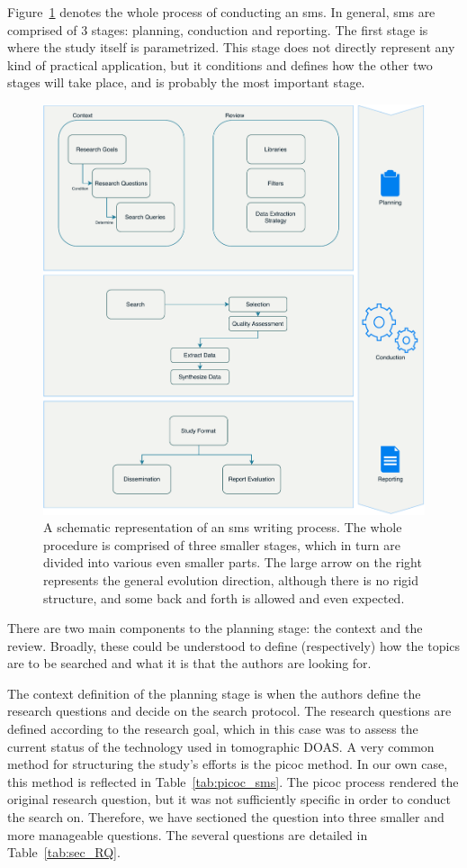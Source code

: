 Figure~\ref{fig:sms_planning} denotes the whole process of conducting
an \gls{sms}. In general, \acrlong{sms} are comprised of 3 stages:
planning, conduction and reporting. The first stage is where the study
itself is parametrized. This stage does not directly represent any kind
of practical application, but it conditions and defines how the other
two stages will take place, and is probably the most important stage.

\begin{figure}[htpb]
    \centering
    \includegraphics[width=.8\textwidth]{img/pdf/sms_planning.pdf}
    \caption{A schematic representation of an \gls{sms} writing process.
    The whole procedure is comprised of three smaller stages, which in
    turn are divided into various even smaller parts. The large arrow on the
    right represents the general evolution direction, although there is no
    rigid structure, and some back and forth is allowed and even expected.}
    \label{fig:sms_planning}
\end{figure}

There are two main components to the planning stage: the context and the
review. Broadly, these could be understood to define (respectively) how
the topics are to be searched and what it is that the authors are
looking for.

The context definition of the planning stage is when the authors define
the research questions and decide on the search protocol. The research
questions are defined according to the research goal, which in this case
was to assess the current status of the technology used in tomographic
\gls{DOAS}. A very common method for structuring the study's efforts is
the \gls{picoc} method. In our own case, this method is reflected in
Table~\ref{tab:picoc_sms}. The \gls{picoc} process rendered the original
research question, but it was not sufficiently specific in order to
conduct the search on. Therefore, we have sectioned the question into
three smaller and more manageable questions. The several questions are
detailed in Table~\ref{tab:sec_RQ}.

